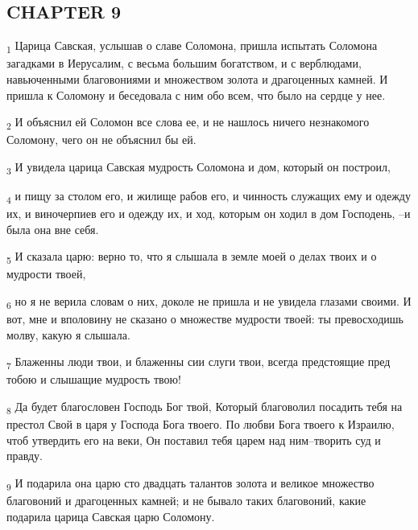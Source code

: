 \subsection{CHAPTER 9}
\begin{tcolorbox}
\textsubscript{1} Царица Савская, услышав о славе Соломона, пришла испытать Соломона загадками в Иерусалим, с весьма большим богатством, и с верблюдами, навьюченными благовониями и множеством золота и драгоценных камней. И пришла к Соломону и беседовала с ним обо всем, что было на сердце у нее.
\end{tcolorbox}
\begin{tcolorbox}
\textsubscript{2} И объяснил ей Соломон все слова ее, и не нашлось ничего незнакомого Соломону, чего он не объяснил бы ей.
\end{tcolorbox}
\begin{tcolorbox}
\textsubscript{3} И увидела царица Савская мудрость Соломона и дом, который он построил,
\end{tcolorbox}
\begin{tcolorbox}
\textsubscript{4} и пищу за столом его, и жилище рабов его, и чинность служащих ему и одежду их, и виночерпиев его и одежду их, и ход, которым он ходил в дом Господень, --и была она вне себя.
\end{tcolorbox}
\begin{tcolorbox}
\textsubscript{5} И сказала царю: верно то, что я слышала в земле моей о делах твоих и о мудрости твоей,
\end{tcolorbox}
\begin{tcolorbox}
\textsubscript{6} но я не верила словам о них, доколе не пришла и не увидела глазами своими. И вот, мне и вполовину не сказано о множестве мудрости твоей: ты превосходишь молву, какую я слышала.
\end{tcolorbox}
\begin{tcolorbox}
\textsubscript{7} Блаженны люди твои, и блаженны сии слуги твои, всегда предстоящие пред тобою и слышащие мудрость твою!
\end{tcolorbox}
\begin{tcolorbox}
\textsubscript{8} Да будет благословен Господь Бог твой, Который благоволил посадить тебя на престол Свой в царя у Господа Бога твоего. По любви Бога твоего к Израилю, чтоб утвердить его на веки, Он поставил тебя царем над ним--творить суд и правду.
\end{tcolorbox}
\begin{tcolorbox}
\textsubscript{9} И подарила она царю сто двадцать талантов золота и великое множество благовоний и драгоценных камней; и не бывало таких благовоний, какие подарила царица Савская царю Соломону.
\end{tcolorbox}
